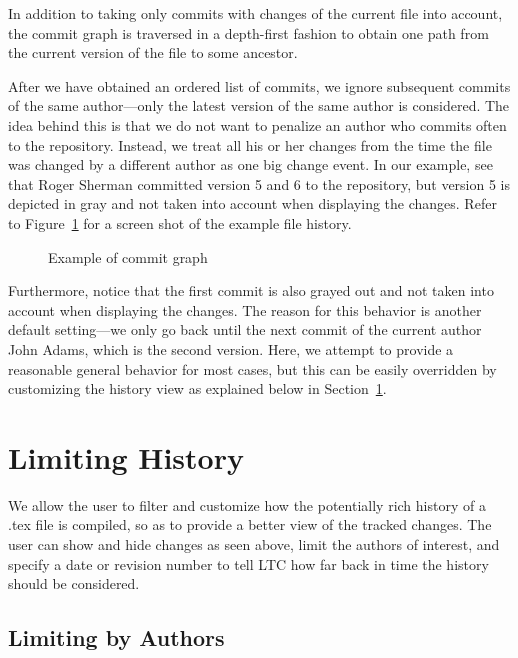 In addition to taking only commits with changes of the current file into account, the commit graph is traversed in a depth-first fashion to obtain one path from the current version of the file to some ancestor.  

After we have obtained an ordered list of commits, we ignore subsequent commits of the same author---only the latest version of the same author is considered.  The idea behind this is that we do not want to penalize an author who commits often to the repository.  Instead, we treat all his or her changes from the time the file was changed by a different author as one big change event.  In our example, see that Roger Sherman committed version 5 and 6 to the repository, but version 5 is depicted in gray and not taken into account when displaying the changes.  Refer to Figure~\ref{fig:commit-graph} for a screen shot of the example file history.
\begin{figure}[t]
\centering
{}
\caption{Example of commit graph} \label{fig:commit-graph}
\end{figure}
Furthermore, notice that the first commit is also grayed out and not taken into account when displaying the changes.  The reason for this behavior is another default setting---we only go back until the next commit of the current author John Adams, which is the second version.  Here, we attempt to provide a reasonable general behavior for most cases, but this can be easily overridden by customizing the history view as explained below in Section~\ref{sec:limit-history}.

\section{Limiting History} \label{sec:limit-history}

We allow the user to filter and customize how the potentially rich history of a .tex file is compiled, so as to provide a better view of the tracked changes.  The user can show and hide changes as seen above, limit the authors of interest, and specify a date or revision number to tell LTC how far back in time the history should be considered.

\subsection{Limiting by Authors}

